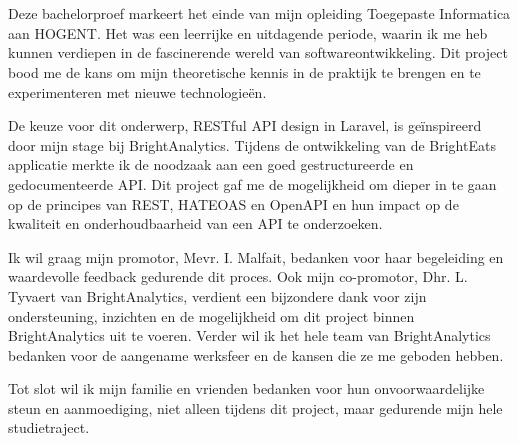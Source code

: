 
\chapter*{}%
\label{ch:voorwoord}

Deze bachelorproef markeert het einde van mijn opleiding Toegepaste Informatica aan HOGENT. Het was een leerrijke en uitdagende periode, waarin ik me heb kunnen verdiepen in de fascinerende wereld van softwareontwikkeling. Dit project bood me de kans om mijn theoretische kennis in de praktijk te brengen en te experimenteren met nieuwe technologieën.

\bigskip

De keuze voor dit onderwerp, RESTful API design in Laravel, is geïnspireerd door mijn stage bij BrightAnalytics. Tijdens de ontwikkeling van de BrightEats applicatie merkte ik de noodzaak aan een goed gestructureerde en gedocumenteerde API. Dit project gaf me de mogelijkheid om dieper in te gaan op de principes van REST, HATEOAS en OpenAPI en hun impact op de kwaliteit en onderhoudbaarheid van een API te onderzoeken.

\bigskip

Ik wil graag mijn promotor, Mevr. I. Malfait, bedanken voor haar begeleiding en waardevolle feedback gedurende dit proces. Ook mijn co-promotor, Dhr. L. Tyvaert van BrightAnalytics, verdient een bijzondere dank voor zijn ondersteuning, inzichten en de mogelijkheid om dit project binnen BrightAnalytics uit te voeren. Verder wil ik het hele team van BrightAnalytics bedanken voor de aangename werksfeer en de kansen die ze me geboden hebben.

\bigskip

Tot slot wil ik mijn familie en vrienden bedanken voor hun onvoorwaardelijke steun en aanmoediging, niet alleen tijdens dit project, maar gedurende mijn hele studietraject.
